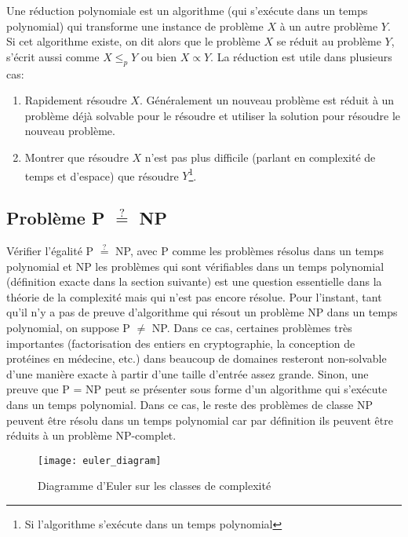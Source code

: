 \documentclass[../main.tex]{subfiles}
\begin{document}
\begin{definition}
Une réduction polynomiale est un algorithme (qui s'exécute dans un temps polynomial) qui transforme une instance de problème $X$ à un autre problème $Y$. Si cet algorithme existe, on dit alors que le problème $X$ se réduit au problème $Y$, s'écrit aussi comme $X \leq _p Y$ ou bien $X \propto Y$. La réduction est utile dans plusieurs cas:
\begin{enumerate}
\item Rapidement résoudre $X$. Généralement un nouveau problème est réduit à un problème déjà solvable pour le résoudre et utiliser la solution pour résoudre le nouveau problème.
\item Montrer que résoudre $X$ n'est pas plus difficile (parlant en complexité de temps et d'espace) que résoudre $Y$\footnote{Si l'algorithme s'exécute dans un temps polynomial}.
\end{enumerate}
\end{definition}

\subsection{Problème P $\stackrel{?}{=}$ NP}
\label{sec:PvNP}
Vérifier l'égalité P $\stackrel{?}{=}$ NP, avec P comme les problèmes résolus dans un temps polynomial et NP les problèmes qui sont vérifiables dans un temps polynomial (définition exacte dans la section suivante) est une question essentielle dans la théorie de la complexité mais qui n'est pas encore résolue. Pour l'instant, tant qu'il n'y a pas de preuve d'algorithme qui résout un problème NP dans un temps polynomial, on suppose P $\neq$ NP. Dans ce cas, certaines problèmes très importantes (factorisation des entiers en cryptographie, la conception de protéines en médecine, etc.) dans beaucoup de domaines resteront non-solvable d'une manière exacte à partir d'une taille d'entrée assez grande. Sinon, une preuve que P = NP peut se présenter sous forme d'un algorithme qui s'exécute dans un temps polynomial. Dans ce cas, le reste des problèmes de classe NP peuvent être résolu dans un temps polynomial car par définition ils peuvent être réduits à un problème NP-complet.

\begin{figure}[!htb]
    \centering
    \texttt{[image: euler\_diagram]}
    \caption{Diagramme d'Euler sur les classes de complexité}
    \label{fig:euler_diagram}
\end{figure}
\end{document}
